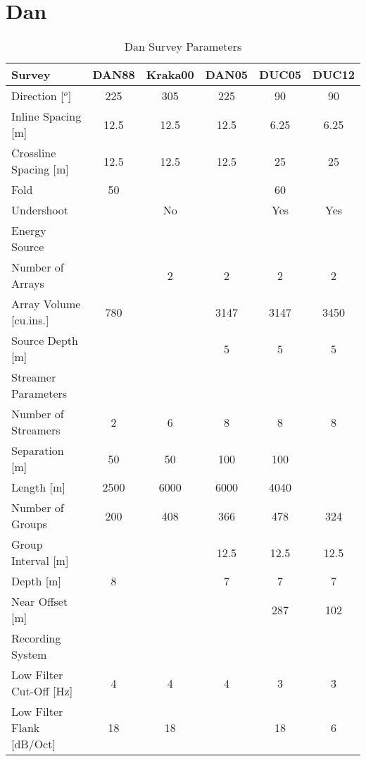 \section*{Dan}
\begin{table}
\centering
\caption{Dan Survey Parameters}
\label{dan-label}
\begin{tabular}{|l|ccccc|}
 \hline
\rowcolor[HTML]{C0C0C0}Survey & \cellcolor[HTML]{C0C0C0}DAN88 & \cellcolor[HTML]{C0C0C0}Kraka00  & \cellcolor[HTML]{C0C0C0}DAN05 & \cellcolor[HTML]{C0C0C0}DUC05 & \cellcolor[HTML]{C0C0C0}DUC12 \\ \hline
Direction [$^o$] & 225 & 305 & 225 & 90 & 90 \\ \hline
Inline Spacing [m] & 12.5 & 12.5 & 12.5 & 6.25 & 6.25 \\ \hline
Crossline Spacing [m] & 12.5 & 12.5 & 12.5 & 25 & 25 \\ \hline
Fold & 50 & & & 60 &  \\ \hline
Undershoot & & No &  & Yes & Yes \\ \hline
\rowcolor[HTML]{C0C0C0} Energy Source & \multicolumn{5}{l|}{\cellcolor[HTML]{C0C0C0}}\\ \hline
Number of Arrays & & 2 & 2 & 2 & 2 \\ \hline
Array Volume [cu.ins.] & 780 & & 3147 & 3147 & 3450 \\ \hline
Source Depth [m] & & & 5 & 5 & 5 \\ \hline
\rowcolor[HTML]{C0C0C0} Streamer Parameters & \multicolumn{5}{l|}{\cellcolor[HTML]{C0C0C0}}\\ \hline
Number of Streamers & 2 & 6 & 8 & 8 & 8 \\ \hline
Separation [m] & 50 & 50 & 100 & 100 \\ \hline 
Length [m] & 2500 & 6000 & 6000 & 4040 \\ \hline
Number of Groups & 200 & 408 & 366 & 478 & 324 \\ \hline
Group Interval [m] & & & 12.5 & 12.5 & 12.5 \\ \hline
Depth [m] & 8 & & 7 & 7 & 7 \\ \hline
Near Offset [m] & & &  & 287 & 102 \\ \hline
\rowcolor[HTML]{C0C0C0} Recording System & \multicolumn{5}{l|}{\cellcolor[HTML]{C0C0C0}}\\ \hline
Low Filter Cut-Off [Hz] & 4 & 4 & 4 & 3 & 3 \\ \hline
Low Filter Flank [dB/Oct] & 18 & 18 &  & 18 & 6 \\ \hline
\end{tabular}
\end{table}


